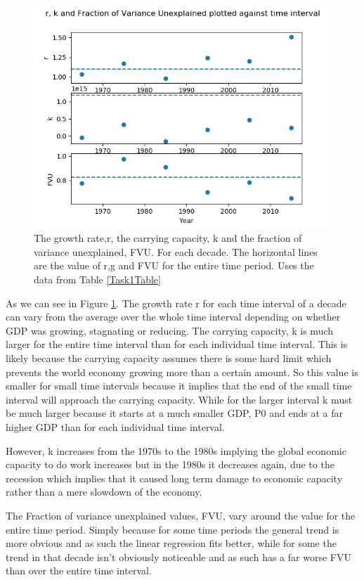 \documentclass[11pt,a4paper]{CLabBookTemplate} %
\begin{document}
\begin{figure}[h!]
	\centering
	\includegraphics[width = 120mm]{Figures/RgkWorld.png}
	\caption{The growth rate,r, the carrying capacity, k and the fraction of variance unexplained, FVU. For each decade. The horizontal lines are the value of r,g and FVU for the entire time period. Uses the data from Table \ref{Task1Table}}
	\label{fig:RgkWORLD}
\end{figure}

As we can see in Figure \ref{fig:RgkWORLD}. The growth rate r for each time interval of a decade can vary from the average over the whole time interval depending on whether GDP was growing, stagnating or reducing. The carrying capacity, k is much larger for the entire time interval than for each individual time interval. This is likely because the carrying capacity assumes there is some hard limit which prevents the world economy growing more than a certain amount. So this value is smaller for small time intervals because it implies that the end of the small time interval will approach the carrying capacity. While for the larger interval k must be much larger because it starts at a much smaller GDP, P0 and ends at a far higher GDP than for each individual time interval. \par
However, k increases from the 1970s to the 1980s implying the global economic capacity to do work increases but in the 1980s it decreases again, due to the recession which implies that it caused long term damage to economic capacity rather than a mere slowdown of the economy. \par
The Fraction of variance unexplained values, FVU, vary around the value for the entire time period. Simply because for some time periods the general trend is more obvious and as such the linear regression fits better, while for some the trend in that decade isn't obviously noticeable and as such has a far worse FVU than over the entire time interval. 
\end{document}

